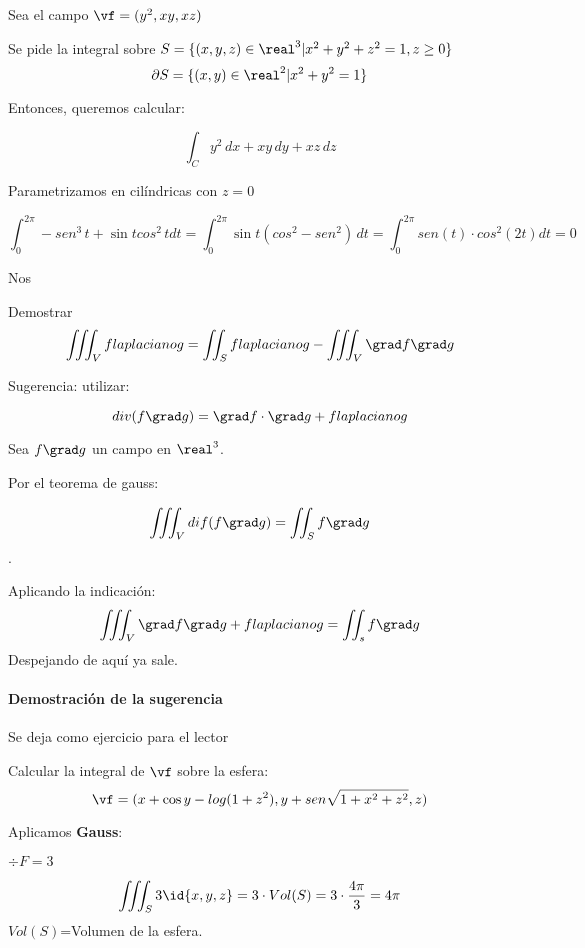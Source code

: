 \begin{problem}[20]
Sea el campo $\vf = (y^2,xy,xz)$

Se pide la integral sobre $S= \{(x,y,z)\in \real^3 | x^2+y^2+z^2=1, z\ge 0\}$
\solution
\[\partial S = \{(x,y)\in\real^2|x^2+y^2=1\}\]

Entonces, queremos calcular:

\[\int_C y^2\,dx + xy\,dy + xz\,dz\]

Parametrizamos en cilíndricas con $z=0$

\[\int_0^{2\pi} -sen^3\,t + \sin tcos^2\,t dt = \int_0^{2\pi} \sin t(cos^2-sen^2)\,dt = \int_0^{2\pi} sen(t)\cdot cos^2(2t)dt = 0\]

Nos

\end{problem}

\begin{problem}[29]
Demostrar
\[\iiint_V f laplaciano g = \iint_S f laplaciano g - \iiint_V \grad f \grad g\]

Sugerencia: utilizar:

\[div(f\grad g) =\grad f \cdot \grad g + f laplaciano g\]
\solution

Sea $f\grad g$ un campo en $\real^3$.

Por el teorema de gauss:

\[\iiint_V dif(f\grad g) = \iint_S f\grad g\].


Aplicando la indicación:
\[\iiint_V \grad f \grad g + f laplaciano g = \iint_s f \grad g\]
Despejando de aquí ya sale.

\paragraph{Demostración de la sugerencia}

Se deja como ejercicio para el lector
\end{problem}

\begin{problem}[24]
Calcular la integral de $\vf$ sobre la esfera:
\[\vf= (x+\cos y - log(1+z^2),y+sen\sqrt{1+x^2+z^2},z)\]

\solution
Aplicamos \textbf{Gauss}:

$\div F = 3$

\[\iiint_S 3\id{x,y,z} = 3\cdot Vol(S) = 3\cdot \frac{4\pi}{3} = 4\pi\]
$Vol(S)$=Volumen de la esfera.
\end{problem}

